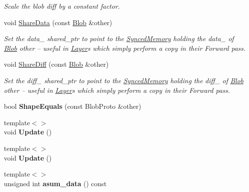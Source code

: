 \begin{DoxyCompactItemize}
\begin{DoxyCompactList}\small\item\em Scale the blob diff by a constant factor. \end{DoxyCompactList}\item 
void \hyperlink{classcaffe_1_1Blob_a8fce5a816a2b9629686db69108610d93}{Share\+Data} (const \hyperlink{classcaffe_1_1Blob}{Blob} \&other)
\begin{DoxyCompactList}\small\item\em Set the data\+\_\+ shared\+\_\+ptr to point to the \hyperlink{classcaffe_1_1SyncedMemory}{Synced\+Memory} holding the data\+\_\+ of \hyperlink{classcaffe_1_1Blob}{Blob} other -- useful in \hyperlink{classcaffe_1_1Layer}{Layer}s which simply perform a copy in their Forward pass. \end{DoxyCompactList}\item 
void \hyperlink{classcaffe_1_1Blob_a004781965b09f94c409cec9a6fc7c35c}{Share\+Diff} (const \hyperlink{classcaffe_1_1Blob}{Blob} \&other)
\begin{DoxyCompactList}\small\item\em Set the diff\+\_\+ shared\+\_\+ptr to point to the \hyperlink{classcaffe_1_1SyncedMemory}{Synced\+Memory} holding the diff\+\_\+ of \hyperlink{classcaffe_1_1Blob}{Blob} other -- useful in \hyperlink{classcaffe_1_1Layer}{Layer}s which simply perform a copy in their Forward pass. \end{DoxyCompactList}\item 
bool {\bfseries Shape\+Equals} (const Blob\+Proto \&other)\hypertarget{classcaffe_1_1Blob_aaf5af1d79ac66f15dd5ebe504b36efcd}{}\label{classcaffe_1_1Blob_aaf5af1d79ac66f15dd5ebe504b36efcd}

\item 
{\footnotesize template$<$$>$ }\\void {\bfseries Update} ()\hypertarget{classcaffe_1_1Blob_a128b3c929b6282d8741543044b81894b}{}\label{classcaffe_1_1Blob_a128b3c929b6282d8741543044b81894b}

\item 
{\footnotesize template$<$$>$ }\\void {\bfseries Update} ()\hypertarget{classcaffe_1_1Blob_a7da970e54e58626753ddd73955164481}{}\label{classcaffe_1_1Blob_a7da970e54e58626753ddd73955164481}

\item 
{\footnotesize template$<$$>$ }\\unsigned int {\bfseries asum\+\_\+data} () const\hypertarget{classcaffe_1_1Blob_aaca009ba67cbcd12c18cf3a766db934f}{}\label{classcaffe_1_1Blob_aaca009ba67cbcd12c18cf3a766db934f}


\end{DoxyCompactItemize}
